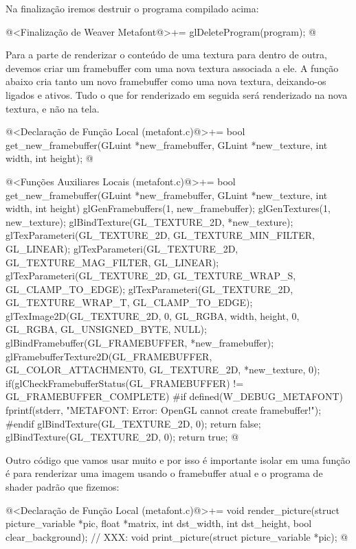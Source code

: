 {Na finalização iremos destruir o programa compilado acima:

\iniciocodigo
@<Finalização de Weaver Metafont@>+=
glDeleteProgram(program);
@
\fimcodigo

Para a parte de renderizar o conteúdo de uma textura para dentro de
outra, devemos criar um framebuffer com uma nova textura associada a
ele. A função abaixo cria tanto um novo framebuffer como uma nova
textura, deixando-os ligados e ativos. Tudo o que for renderizado em
seguida será renderizado na nova textura, e não na tela.

\iniciocodigo
@<Declaração de Função Local (metafont.c)@>+=
bool get_new_framebuffer(GLuint *new_framebuffer, GLuint *new_texture,
                         int width, int height);
@
\fimcodigo

\iniciocodigo
@<Funções Auxiliares Locais (metafont.c)@>+=
bool get_new_framebuffer(GLuint *new_framebuffer, GLuint *new_texture,
                         int width, int height){
  glGenFramebuffers(1, new_framebuffer);
  glGenTextures(1, new_texture);
  glBindTexture(GL_TEXTURE_2D, *new_texture);
  glTexParameteri(GL_TEXTURE_2D, GL_TEXTURE_MIN_FILTER, GL_LINEAR);
  glTexParameteri(GL_TEXTURE_2D, GL_TEXTURE_MAG_FILTER, GL_LINEAR);
  glTexParameteri(GL_TEXTURE_2D, GL_TEXTURE_WRAP_S, GL_CLAMP_TO_EDGE);
  glTexParameteri(GL_TEXTURE_2D, GL_TEXTURE_WRAP_T, GL_CLAMP_TO_EDGE);
  glTexImage2D(GL_TEXTURE_2D, 0, GL_RGBA, width, height, 0, GL_RGBA,
               GL_UNSIGNED_BYTE, NULL);
  glBindFramebuffer(GL_FRAMEBUFFER, *new_framebuffer);
  glFramebufferTexture2D(GL_FRAMEBUFFER, GL_COLOR_ATTACHMENT0, GL_TEXTURE_2D,
                         *new_texture, 0);
  if(glCheckFramebufferStatus(GL_FRAMEBUFFER) != GL_FRAMEBUFFER_COMPLETE){
#if defined(W_DEBUG_METAFONT)
    fprintf(stderr, "METAFONT: Error: OpenGL cannot create framebuffer!\n");
#endif
    glBindTexture(GL_TEXTURE_2D, 0);
    return false;
  }
  glBindTexture(GL_TEXTURE_2D, 0);
  return true;
}
@
\fimcodigo

Outro código que vamos usar muito e por isso é importante isolar em
uma função é para renderizar uma imagem usando o framebuffer atual e o
programa de shader padrão que fizemos:

\iniciocodigo
@<Declaração de Função Local (metafont.c)@>+=
void render_picture(struct picture_variable *pic, float *matrix, int dst_width,
                    int dst_height, bool clear_background);
// XXX:
void print_picture(struct picture_variable *pic);
@
\fimcodigo

}
